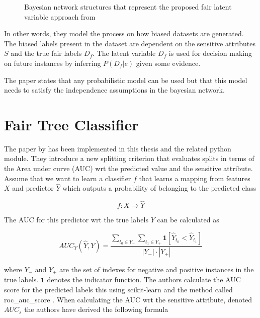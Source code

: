 \begin{figure}[h!]
    \centering
    \caption{Bayesian network structures that represent the proposed
fair latent variable approach from \cite{Choi:2021:AIII}}
    \label{fig:choinetwork}
\end{figure}

In other words, they model the process on how biased datasets are generated. The biased labels present in the dataset are dependent on the sensitive attributes $S$ and the true fair labels $D_f$. The latent variable $D_f$ is used for decision making on future instances by inferring $P(D_f|e)$ given some evidence.

The paper states that any probabilistic model can be used but that this model needs to satisfy the independence assumptions in the bayesian network.

\section{Fair Tree Classifier}
\label{sec:fairtree}

The paper by \citet{Antonio:2021:arXiv} has been implemented in this thesis and the related python module. They introduce a new splitting criterion that evaluates splits in terms of the Area under curve (AUC) wrt the predicted value and the sensitive attribute. Assume that we want to learn a classifier $f$ that learns a mapping from features $X$ and predictor $\hat{Y}$ which outputs a probability of belonging to the predicted class

$$
f: X \rightarrow \hat{Y}
$$

The AUC for this predictor wrt the true labels $Y$ can be calculated as

\begin{equation*}
    AUC_Y(\hat{Y}, Y) =  \frac
    {
        \sum_{t_0 \in Y_{-}} \sum_{t_1 \in Y_{+}}  \textbf{1}[\hat{Y}_{t_0} < \hat{Y}_{t_1}]
    }
    {
        |Y_{-}| \cdot |Y_{+}|
    }
\end{equation*}

where $Y_-$ and $Y_+$ are the set of indexes for negative and positive instances in the true labels. $\textbf{1}$ denotes the indicator function. The authors calculate the AUC score for the predicted labels this using scikit-learn \cite{Pedregosa:2011:JMLR} and the method called roc\_auc\_score \cite{Buitinck:2013:PKDD}. When calculating the AUC wrt the sensitive attribute, denoted $AUC_s$ the authors have derived the following formula

